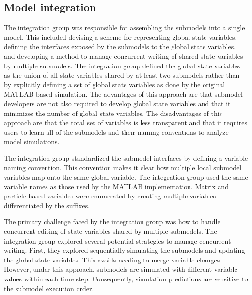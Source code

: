 \documentclass[journal,transmag]{IEEEtran}
\begin{document}
\subsection{Model integration}
The integration group was responsible for assembling the submodels into a single model. This included devising a scheme for representing global state variables, defining the interfaces exposed by the submodels to the global state variables, and developing a method to manage concurrent writing of shared state variables by multiple submodels. The integration group defined the global state variables as the union of all state variables shared by at least two submodels rather than by explicitly defining a set of global state variables as done by the original MATLAB-based simulation. The advantages of this approach are that submodel developers are not also required to develop global state variables and that it minimizes the number of global state variables. The disadvantages of this approach are that the total set of variables is less transparent and that it requires users to learn all of the submodels and their naming conventions to analyze model simulations.

The integration group standardized the submodel interfaces by defining a variable naming convention. This convention makes it clear how multiple local submodel variables map onto the same global variable. The integration group used the same variable names as those used by the MATLAB implementation. Matrix and particle-based variables were enumerated by creating multiple variables differentiated by the suffixes.

The primary challenge faced by the integration group was how to handle concurrent editing of state variables shared by multiple submodels. The integration group explored several potential strategies to manage concurrent writing. First, they explored sequentially simulating the submodels and updating the global state variables. This avoids needing to merge variable changes. However, under this approach, submodels are simulated with different variable values within each time step. Consequently, simulation predictions are sensitive to the submodel execution order. 
\end{document}
